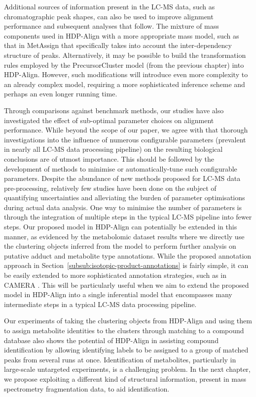 Additional sources of information present in the LC-MS data, such as chromatographic peak shapes, can also be used to improve alignment performance and subsequent analyses that follow. The mixture of mass components used in HDP-Align with a more appropriate mass model, such as that in MetAssign \cite{Daly2014} that specifically takes into account the inter-dependency structure of peaks. Alternatively, it may be possible to build the transformation rules employed by the PrecursorCluster model (from the previous chapter) into HDP-Align. However, such modifications will introduce even more complexity to an already complex model, requiring a more sophisticated inference scheme and perhaps an even longer running time.

Through comparisons against benchmark methods, our studies have also investigated the effect of sub-optimal parameter choices on alignment performance. While beyond the scope of our paper, we agree with \cite{Smith2013, Smith2013a} that thorough investigations into the influence of numerous configurable parameters (prevalent in nearly all LC-MS data processing pipeline) on the resulting biological conclusions are of utmost importance. This should be followed by the development of methods to minimise or automatically-tune such configurable parameters. Despite the abundance of new methods proposed for LC-MS data pre-processing, relatively few studies have been done on the subject of quantifying uncertainties and alleviating the burden of parameter optimisations during actual data analysis. One way to minimise the number of parameters is through the integration of multiple steps in the typical LC-MS pipeline into fewer steps. Our proposed model in HDP-Align can potentially be extended in this manner, as evidenced by the metabolomic dataset results where we directly use the clustering objects inferred from the model to perform further analysis on putative adduct and metabolite type annotations. While the proposed annotation approach in Section~\ref{subsub:isotopic-product-annotations} is fairly simple, it can be easily extended to more sophisticated annotation strategies, such as in CAMERA \cite{Kuhl2012}. This will be particularly useful when we aim to extend the proposed model in HDP-Align into a single inferential model that encompasses many intermediate steps in a typical LC-MS data processing pipeline. 

Our experiments of taking the clustering objects from HDP-Align and using them to assign metabolite identities to the clusters through matching to a compound database also shows the potential of HDP-Align in assisting compound identification by allowing identifying labels to be assigned to a group of matched peaks from several runs at once. Identification of metabolites, particularly in large-scale untargeted experiments, is a challenging problem. In the next chapter, we propose exploiting a different kind of structural information, present in mass spectrometry fragmentation data, to aid identification.